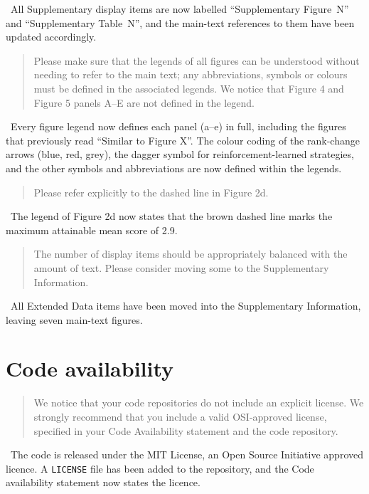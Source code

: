 \documentclass[11pt]{article}
\newcommand{\reply}{\vspace{0.25em}{\color{ForestGreen}\textbf{Reply:}}\ }
\newenvironment{editorcomment}
{\vspace{0.5em}\begin{quote}\color{NavyBlue}}
{\end{quote}}
\begin{document}
\reply All Supplementary display items are now labelled ``Supplementary
Figure~N'' and ``Supplementary Table~N'', and the main-text references to them
have been updated accordingly.

\begin{editorcomment}
Please make sure that the legends of all figures can be understood without
needing to refer to the main text; any abbreviations, symbols or colours must be
defined in the associated legends. We notice that Figure 4 and Figure 5 panels
A--E are not defined in the legend.
\end{editorcomment}

\reply Every figure legend now defines each panel (a--e) in full, including the
figures that previously read ``Similar to Figure X''. The colour coding of the
rank-change arrows (blue, red, grey), the dagger symbol for reinforcement-learned
strategies, and the other symbols and abbreviations are now defined within the
legends.

\begin{editorcomment}
Please refer explicitly to the dashed line in Figure 2d.
\end{editorcomment}

\reply The legend of Figure 2d now states that the brown dashed line marks the
maximum attainable mean score of 2.9.

\begin{editorcomment}
The number of display items should be appropriately balanced with the amount of
text. Please consider moving some to the Supplementary Information.
\end{editorcomment}

\reply All Extended Data items have been moved into the Supplementary
Information, leaving seven main-text figures.

\section*{Code availability}

\begin{editorcomment}
We notice that your code repositories do not include an explicit license. We
strongly recommend that you include a valid OSI-approved license, specified in
your Code Availability statement and the code repository.
\end{editorcomment}

\reply The code is released under the MIT License, an Open Source Initiative
approved licence. A \texttt{LICENSE} file has been added to the repository, and
the Code availability statement now states the licence.
\end{document}
